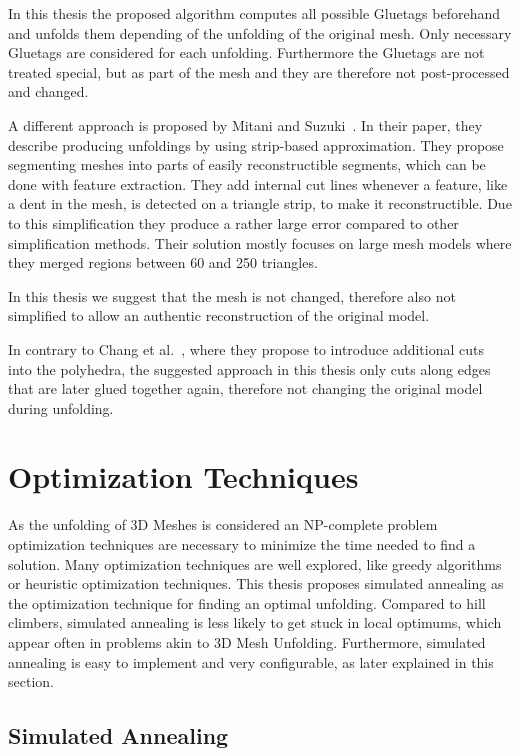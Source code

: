 \documentclass[draft,final]{vutinfth} %
\begin{document}
In this thesis the proposed algorithm computes all possible Gluetags beforehand and unfolds them depending of the unfolding of the original mesh. Only necessary Gluetags are considered for each unfolding. Furthermore the Gluetags are not treated special, but as part of the mesh and they are therefore not post-processed and changed.

A different approach is proposed by Mitani and Suzuki~\cite{mitani2004making}. In their paper, they describe producing unfoldings by using strip-based approximation. They propose segmenting meshes into parts of easily reconstructible segments, which can be done with feature extraction. They add internal cut lines whenever a feature, like a dent in the mesh, is detected on a triangle strip, to make it reconstructible. Due to this simplification they produce a rather large error compared to other simplification methods. Their solution mostly focuses on large mesh models where they merged regions between 60 and 250 triangles.

In this thesis we suggest that the mesh is not changed, therefore also not simplified to allow an authentic reconstruction of the original model. 

In contrary to Chang et al.~\cite{chang2017improved}, where they propose to introduce additional cuts into the polyhedra, the suggested approach in this thesis only cuts along edges that are later glued together again, therefore not changing the original model during unfolding.

\section{Optimization Techniques}
\label{sec:sa}
As the unfolding of 3D Meshes is considered an NP-complete problem\cite{haenselmann2012optimal} optimization techniques are necessary to minimize the time needed to find a solution. Many optimization techniques are well explored, like greedy algorithms\cite{devore1996some} or heuristic optimization techniques\cite{lee2008modern}. This thesis proposes simulated annealing as the optimization technique for finding an optimal unfolding. Compared to hill climbers, simulated annealing is less likely to get stuck in local optimums, which appear often in problems akin to 3D Mesh Unfolding. Furthermore, simulated annealing is easy to implement and very configurable, as later explained in this section.

\subsection{Simulated Annealing}
\end{document}
